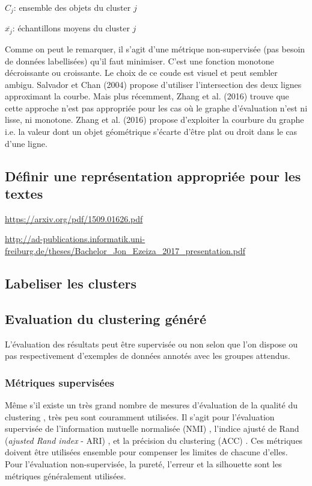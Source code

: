 $C_j$: ensemble des objets du cluster $j$

$\overline{x_j}$: échantillons moyens du cluster $j$

Comme on peut le remarquer, il s’agit d’une métrique non-supervisée (pas besoin de données labellisées) qu’il faut minimiser. C’est une fonction monotone décroissante ou croissante. Le choix de ce coude est visuel et peut sembler ambigu. Salvador et Chan (2004) propose d’utiliser l’intersection des deux lignes approximant la courbe. Mais plus récemment, Zhang et al. (2016) trouve que cette approche n’est pas appropriée pour les cas où le graphe d’évaluation n’est ni lisse, ni monotone. Zhang et al. (2016) propose d’exploiter la courbure du graphe i.e. la valeur dont un objet géométrique s'écarte d'être plat ou droit dans le cas d'une ligne.

\subsection{Définir une représentation appropriée pour les textes}
\url{https://arxiv.org/pdf/1509.01626.pdf}

\url{http://ad-publications.informatik.uni-freiburg.de/theses/Bachelor_Jon_Ezeiza_2017_presentation.pdf}


\subsection{Labeliser les clusters}

\subsection{Evaluation du clustering généré}
L'évaluation des résultats peut être supervisée ou non selon que l'on dispose ou pas respectivement d'exemples de données annotés avec les groupes attendus.

\subsubsection{Métriques supervisées}
\label{sec:similarite:biblio:supeval}
Même s'il existe un très grand nombre de mesures d'évaluation de la qualité du clustering \citep{im2003clusteringsurvey}, très peu sont couramment utilisées. Il s'agit pour l'évaluation supervisée de l'information mutuelle normalisée (NMI) \citep{}, l'indice ajusté de Rand (\textit{ajusted Rand index} - ARI) \citep{}, et la précision du clustering (ACC) \citep{}. Ces métriques doivent être utilisées ensemble \cite{yang2017kmeansfriendlyspaces} pour compenser les limites de chacune d'elles. Pour l'évaluation non-supervisée, la pureté, l'erreur et la silhouette sont les métriques généralement utilisées.

